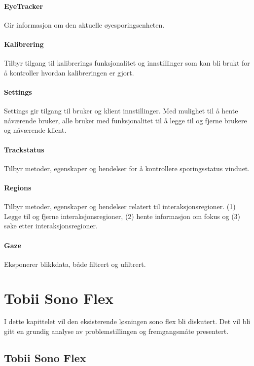 \documentclass[phd,tocprelim]{cornell}
\begin{document}
\subsubsection{EyeTracker}
Gir informasjon om den aktuelle øyesporingsenheten.

\subsubsection{Kalibrering}
Tilbyr tilgang til kalibrerings funksjonalitet og innstillinger som kan bli brukt for å kontroller hvordan kalibreringen er gjort.

\subsubsection{Settings}
Settings gir tilgang til bruker og klient innstillinger. Med mulighet til å hente nåværende bruker, alle bruker med funksjonalitet til å legge til og fjerne brukere og nåværende klient.

\subsubsection{Trackstatus}
Tilbyr metoder, egenskaper og hendelser for å kontrollere sporingsstatus vinduet. 


\subsubsection{Regions}
Tilbyr metoder, egenskaper og hendelser relatert til interaksjonsregioner. (1) Legge til og fjerne interaksjonsregioner, (2) hente informasjon om fokus og (3) søke etter interaksjonsregioner.

\subsubsection{Gaze}
Eksponerer blikkdata, både filtrert og ufiltrert. 


\chapter{Tobii Sono Flex}

I dette kapittelet vil den eksisterende løsningen sono flex bli diskutert. Det vil bli gitt en grundig analyse av problemstillingen og fremgangsmåte presentert.


\section{Tobii Sono Flex}
\label{chap:Tobii-Sono-Flex}
\end{document}
